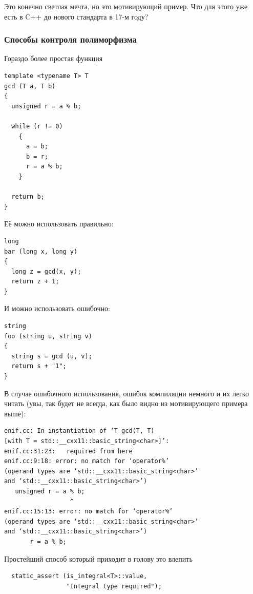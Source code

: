 \documentclass[a4paper,12pt,oneside]{article}
\begin{document}
Это конечно светлая мечта, но это мотивирующий пример. Что для этого уже есть в C++ до нового стандарта в 17-м году?

\subsubsection{Способы контроля полиморфизма}

Гораздо более простая функция

\begin{lstlisting}
template <typename T> T
gcd (T a, T b)
{
  unsigned r = a % b;

  while (r != 0)
    {
      a = b;
      b = r;
      r = a % b;
    }

  return b;
}
\end{lstlisting}

Её можно использовать правильно:

\begin{lstlisting}
long
bar (long x, long y)
{
  long z = gcd(x, y);
  return z + 1;
}
\end{lstlisting}

И можно использовать ошибочно:

\begin{lstlisting}
string
foo (string u, string v)
{
  string s = gcd (u, v);
  return s + "1";  
}
\end{lstlisting}

В случае ошибочного использования, ошибок компиляции немного и их легко читать (увы, так будет не всегда, как было видно из мотивирующего примера выше):

\begin{verbatim}
enif.cc: In instantiation of ‘T gcd(T, T) 
[with T = std::__cxx11::basic_string<char>]’:
enif.cc:31:23:   required from here
enif.cc:9:18: error: no match for ‘operator%’ 
(operand types are ‘std::__cxx11::basic_string<char>’ 
and ‘std::__cxx11::basic_string<char>’)
   unsigned r = a % b;
                  ^
enif.cc:15:13: error: no match for ‘operator%’ 
(operand types are ‘std::__cxx11::basic_string<char>’ 
and ‘std::__cxx11::basic_string<char>’)
       r = a % b;
\end{verbatim}

Простейший способ который приходит в голову это влепить 

\begin{lstlisting}
  static_assert (is_integral<T>::value,
                 "Integral type required");
\end{lstlisting}
\end{document}
